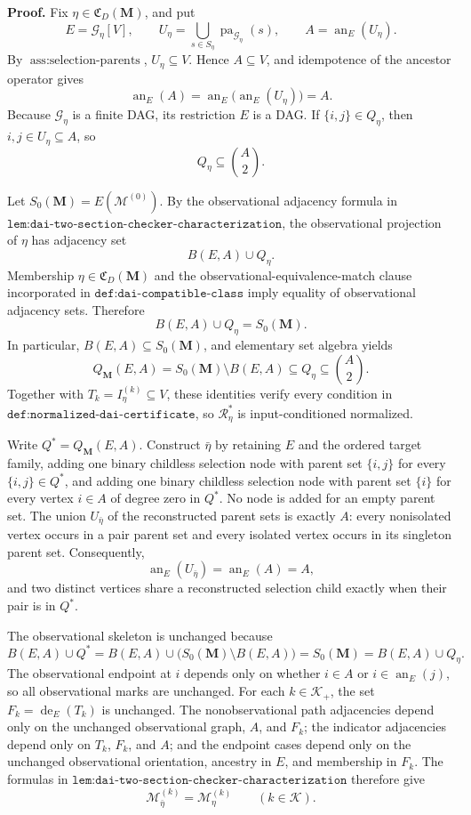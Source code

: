 \textbf{Proof.}
Fix \(\eta\in\mathfrak C_D(\mathbf M)\), and put
\[
E=\mathcal G_\eta[V],
\qquad
U_\eta=\bigcup_{s\in S_\eta}\operatorname{pa}_{\mathcal G_\eta}(s),
\qquad
A=\operatorname{an}_E(U_\eta).
\]
By \(\operatorname{ass{:}selection\text{-}parents}\), \(U_\eta\subseteq V\).  Hence \(A\subseteq V\), and idempotence of the ancestor operator gives
\[
\operatorname{an}_E(A)
=\operatorname{an}_E\!\bigl(\operatorname{an}_E(U_\eta)\bigr)
=A.
\]
Because \(\mathcal G_\eta\) is a finite DAG, its restriction \(E\) is a DAG.  If \(\{i,j\}\in Q_\eta\), then \(i,j\in U_\eta\subseteq A\), so
\[
Q_\eta\subseteq\binom A2.
\]

Let \(S_0(\mathbf M)=E(\mathcal M^{(0)})\).  By the observational adjacency formula in \(\texttt{lem:dai-two-section-checker-characterization}\), the observational projection of \(\eta\) has adjacency set
\[
B(E,A)\cup Q_\eta.
\]
Membership \(\eta\in\mathfrak C_D(\mathbf M)\) and the observational-equivalence-match clause incorporated in \(\texttt{def:dai-compatible-class}\) imply equality of observational adjacency sets.  Therefore
\[
B(E,A)\cup Q_\eta=S_0(\mathbf M).
\]
In particular, \(B(E,A)\subseteq S_0(\mathbf M)\), and elementary set algebra yields
\[
Q_{\mathbf M}(E,A)
=S_0(\mathbf M)\setminus B(E,A)
\subseteq Q_\eta
\subseteq\binom A2.
\]
Together with \(T_k=I_\eta^{(k)}\subseteq V\), these identities verify every condition in \(\texttt{def:normalized-dai-certificate}\), so \(\mathcal R_\eta^*\) is input-conditioned normalized.

Write \(Q^*=Q_{\mathbf M}(E,A)\).  Construct \(\bar\eta\) by retaining \(E\) and the ordered target family, adding one binary childless selection node with parent set \(\{i,j\}\) for every \(\{i,j\}\in Q^*\), and adding one binary childless selection node with parent set \(\{i\}\) for every vertex \(i\in A\) of degree zero in \(Q^*\).  No node is added for an empty parent set.  The union \(U_{\bar\eta}\) of the reconstructed parent sets is exactly \(A\): every nonisolated vertex occurs in a pair parent set and every isolated vertex occurs in its singleton parent set.  Consequently,
\[
\operatorname{an}_E(U_{\bar\eta})
=\operatorname{an}_E(A)=A,
\]
and two distinct vertices share a reconstructed selection child exactly when their pair is in \(Q^*\).

The observational skeleton is unchanged because
\[
B(E,A)\cup Q^*
=B(E,A)\cup\bigl(S_0(\mathbf M)\setminus B(E,A)\bigr)
=S_0(\mathbf M)
=B(E,A)\cup Q_\eta.
\]
The observational endpoint at \(i\) depends only on whether \(i\in A\) or \(i\in\operatorname{an}_E(j)\), so all observational marks are unchanged.  For each \(k\in\mathcal K_+\), the set \(F_k=\operatorname{de}_E(T_k)\) is unchanged.  The nonobservational path adjacencies depend only on the unchanged observational graph, \(A\), and \(F_k\); the indicator adjacencies depend only on \(T_k\), \(F_k\), and \(A\); and the endpoint cases depend only on the unchanged observational orientation, ancestry in \(E\), and membership in \(F_k\).  The formulas in \(\texttt{lem:dai-two-section-checker-characterization}\) therefore give
\[
\mathcal M_{\bar\eta}^{(k)}=\mathcal M_\eta^{(k)}
\qquad(k\in\mathcal K).
\]


